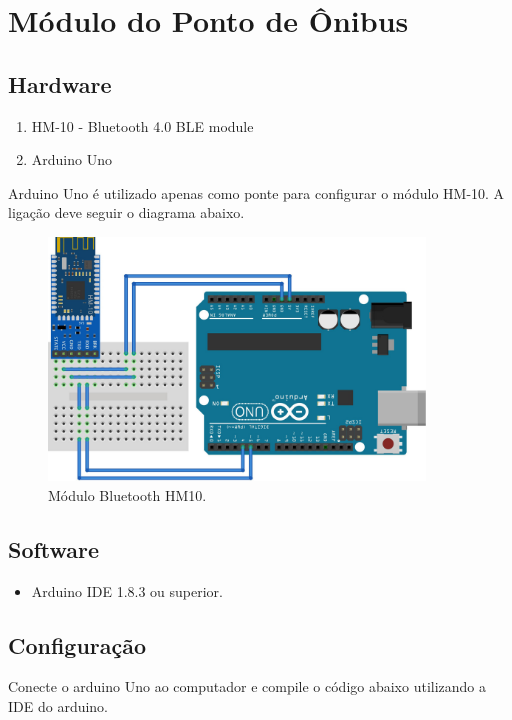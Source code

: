 \documentclass[
	12pt,				%
	oneside,			%
	a4paper,			%
	brazil				%
]{abntex2}
\begin{document}
\section{Módulo do Ponto de Ônibus}

\subsection{Hardware}

\begin{enumerate}
\item HM-10 - Bluetooth 4.0 BLE module
\item Arduino Uno
\end{enumerate}

Arduino Uno é utilizado apenas como ponte para configurar o módulo HM-10. A ligação deve seguir o diagrama abaixo.


\begin{figure}[!h]
\centering
\includegraphics[width=10cm, center]{images/arduino-hm10}
\caption{Módulo Bluetooth HM10.}
\label{Rotulo}
\end{figure}

\subsection{Software}

\begin{itemize}
\item Arduino IDE 1.8.3 ou superior. 
\end{itemize}

\subsection{Configuração}

Conecte o arduino Uno ao computador e compile o código abaixo utilizando a IDE do arduino.
\end{document}
